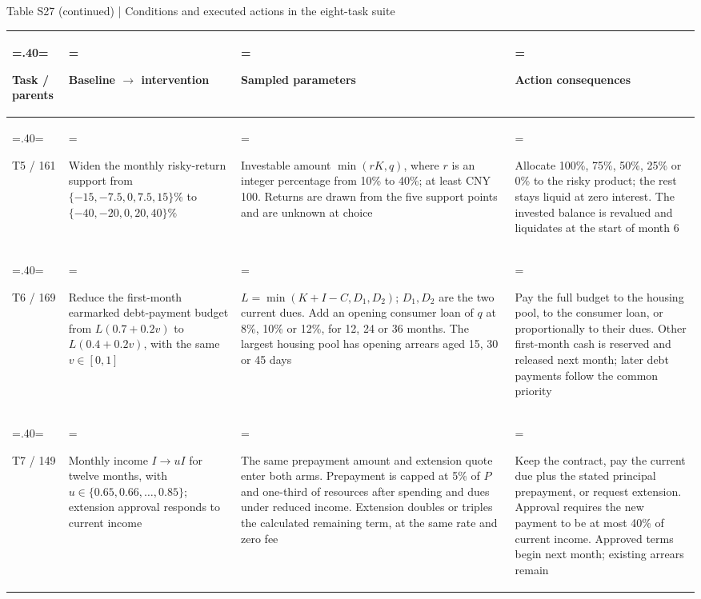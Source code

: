 \documentclass[10pt]{article}
\begin{document}
\begin{center}\begin{minipage}{\textwidth}\fontsize{8}{9.7}\selectfont
Table S27 (continued) | Conditions and executed actions in the eight-task suite
\par\vspace{4pt}
\begin{tabularx}{\textwidth}{@{}>{\hsize=.40\hsize\linewidth=\hsize\raggedright\arraybackslash}X>{\hsize=1.20\hsize\linewidth=\hsize\raggedright\arraybackslash}X>{\hsize=1.20\hsize\linewidth=\hsize\raggedright\arraybackslash}X>{\hsize=1.20\hsize\linewidth=\hsize\raggedright\arraybackslash}X@{}}\toprule
Task / parents & Baseline $\to$ intervention & Sampled parameters & Action consequences \\
\midrule
T5 / 161 & Widen the monthly risky-return support from $\{-15,-7.5,0,7.5,15\}\%$ to $\{-40,-20,0,20,40\}\%$ & Investable amount $\min(rK,q)$, where $r$ is an integer percentage from 10\% to 40\%; at least CNY 100. Returns are drawn from the five support points and are unknown at choice & Allocate 100\%, 75\%, 50\%, 25\% or 0\% to the risky product; the rest stays liquid at zero interest. The invested balance is revalued and liquidates at the start of month 6 \\
\addlinespace[4pt]
T6 / 169 & Reduce the first-month earmarked debt-payment budget from $L(0.7+0.2v)$ to $L(0.4+0.2v)$, with the same $v\in[0,1]$ & $L=\min(K+I-C,D_1,D_2)$; $D_1,D_2$ are the two current dues. Add an opening consumer loan of $q$ at 8\%, 10\% or 12\%, for 12, 24 or 36 months. The largest housing pool has opening arrears aged 15, 30 or 45 days & Pay the full budget to the housing pool, to the consumer loan, or proportionally to their dues. Other first-month cash is reserved and released next month; later debt payments follow the common priority \\
\addlinespace[4pt]
T7 / 149 & Monthly income $I\to uI$ for twelve months, with $u\in\{0.65,0.66,\ldots,0.85\}$; extension approval responds to current income & The same prepayment amount and extension quote enter both arms. Prepayment is capped at 5\% of $P$ and one-third of resources after spending and dues under reduced income. Extension doubles or triples the calculated remaining term, at the same rate and zero fee & Keep the contract, pay the current due plus the stated principal prepayment, or request extension. Approval requires the new payment to be at most 40\% of current income. Approved terms begin next month; existing arrears remain \\

\end{tabularx}
\end{minipage}
\end{center}
\end{document}
